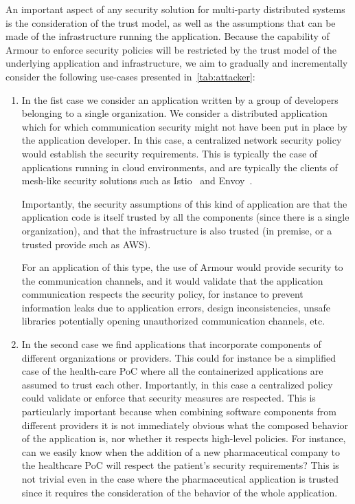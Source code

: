 \documentclass[a4paper%
]{article}
\newcommand{\gp}[1]{\gpnote{#1}}
\newcommand{\armour}{{\sc Armour}}
\begin{document}
An important aspect of any security solution for multi-party
distributed systems is the consideration of the trust model, as well
as the assumptions that can be made of the infrastructure running the
application.
%
Because the capability of \armour{} to enforce security policies will
be restricted by the trust model of the underlying application and
infrastructure, we aim to gradually and incrementally consider the
following use-cases presented in~\autoref{tab:attacker}:
\begin{enumerate}
\item In the fist case we consider an application written by a group
  of developers belonging to a single organization.
  We consider a distributed application which for which communication
  security might not have been put in place by the application
  developer.
  In this case, a centralized network security policy would establish
  the security requirements.
  This is typically the case of applications running in cloud
  environments, and are typically the clients of mesh-like security
  solutions such as Istio~\cite{istio} and Envoy~\cite{envoy}.

  Importantly, the security assumptions of this kind of application
  are that the application code is itself trusted by all the
  components (since there is a single organization), and that the
  infrastructure is also trusted (in premise, or a trusted provide
  such as AWS).

  For an application of this type, the use of \armour{} would provide
  security to the communication channels, and it would validate that
  the application communication respects the security policy, for
  instance to prevent information leaks due to application errors,
  design inconsistencies, unsafe libraries potentially opening
  unauthorized communication channels, etc.
 
\item In the second case we find applications that incorporate
  components of different organizations or providers.
  This could for instance be a simplified case of the health-care
  PoC where all the containerized applications are assumed to trust
  each other.
  Importantly, in this case a centralized policy could validate or
  enforce that security measures are respected.
  This is particularly important because when combining software
  components from different providers it is not immediately obvious
  what the composed behavior of the application is, nor whether it
  respects high-level policies.
  For instance, can we easily know when the addition of a new
  pharmaceutical company to the healthcare PoC will respect the
  patient's security requirements? This is not trivial even in the case
  where the pharmaceutical application is trusted since it requires
  the consideration of the behavior of the whole application.


\end{enumerate}
\end{document}
